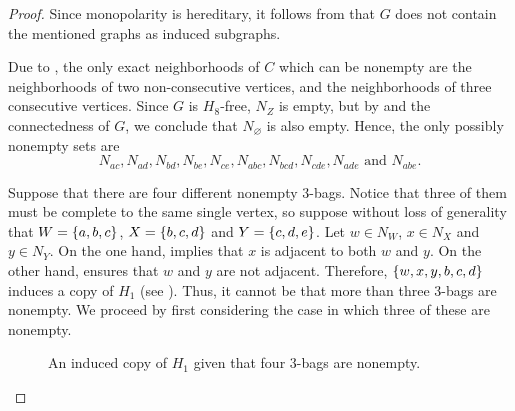\begin{proof}
    Since monopolarity is hereditary, it follows from
     that $G$ does not
    contain the mentioned graphs as induced subgraphs.
    
    Due to , the only exact neighborhoods of $C$
    which can be nonempty are the neighborhoods of two non-consecutive vertices,
    and the neighborhoods of three consecutive vertices.   Since $G$ is
    $H_8$-free, $N_Z$ is empty, but by  and the connectedness
    of $G$, we conclude that $N_\varnothing$ is also empty. Hence, the only
    possibly nonempty sets are
    \[
        N_{ac}, N_{ad}, N_{bd}, N_{be}, N_{ce}, N_{abc}, N_{bcd}, N_{cde},
        N_{ade} \text{ and } N_{abe}.
    \]
    
    Suppose that there are four different nonempty $3$-bags. Notice that three
    of them must be complete to the same single vertex, so suppose without loss
    of generality that $W=\left\{a,b,c\right\}$, $X=\left\{b,c,d\right\}$ and $Y=\left\{c,d,e\right\}$. Let $w\in
    N_W$, $x\in N_X$ and $y\in N_Y$. On the one hand, 
    implies that $x$ is adjacent to both $w$ and $y$. On the other hand,
     ensures that $w$ and $y$ are not adjacent.
    Therefore, $\left\{w,x,y,b,c,d\right\}$ induces a copy of $H_1$ (see
    ). Thus, it cannot be that more than three 3-bags
    are nonempty. We proceed by first considering the case in which three of
    these are nonempty.

    \begin{figure}[htb!]
        \centering
        \caption{An induced copy of $H_1$ given that four 3-bags are nonempty.}
        \label{fig:3_consec_bags}
    \end{figure}
    

\end{proof}
